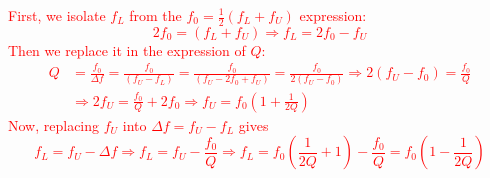 \textcolor{red}{
First, we isolate $f_L$ from the $f_0=\frac{1}{2}(f_L+f_U)$ expression:
\begin{equation*}
	2f_0=(f_L+f_U)\Rightarrow f_L=2f_0-f_U
\end{equation*}
Then we replace it in the expression of $Q$:
\begin{align*}
	Q&=\frac{f_0}{\Delta f}=\frac{f_0}{(f_U-f_L)}=\frac{f_0}{(f_U-2f_0+f_U)}=\frac{f_0}{2(f_U-f_0)}\Rightarrow 2(f_U-f_0)=\frac{f_0}{Q}\\
	&\Rightarrow 2f_U=\frac{f_0}{Q}+2f_0\Rightarrow f_U=f_0\left(1+\frac{1}{2Q}\right)
\end{align*}
Now, replacing $f_U$ into $\Delta f=f_U-f_L$ gives
\begin{equation*}
	f_L=f_U-\Delta f\Rightarrow f_L=f_U-\frac{f_0}{Q}
	\Rightarrow f_L=f_0\left(\frac{1}{2Q}+1\right)-\frac{f_0}{Q}=f_0\left(1-\frac{1}{2Q}\right)
\end{equation*}
}